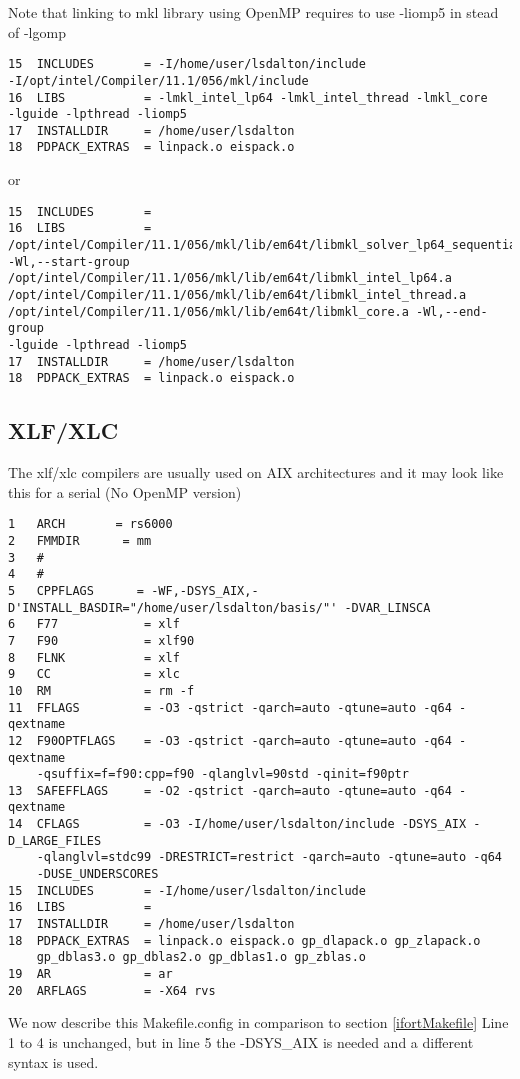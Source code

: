 Note that linking to mkl library using OpenMP requires to use -liomp5 in stead of -lgomp
\begin{verbatim}
15  INCLUDES       = -I/home/user/lsdalton/include 
-I/opt/intel/Compiler/11.1/056/mkl/include
16  LIBS           = -lmkl_intel_lp64 -lmkl_intel_thread -lmkl_core 
-lguide -lpthread -liomp5
17  INSTALLDIR     = /home/user/lsdalton
18  PDPACK_EXTRAS  = linpack.o eispack.o
\end{verbatim}
or
\begin{verbatim}
15  INCLUDES       = 
16  LIBS           = 
/opt/intel/Compiler/11.1/056/mkl/lib/em64t/libmkl_solver_lp64_sequential.a 
-Wl,--start-group /opt/intel/Compiler/11.1/056/mkl/lib/em64t/libmkl_intel_lp64.a 
/opt/intel/Compiler/11.1/056/mkl/lib/em64t/libmkl_intel_thread.a 
/opt/intel/Compiler/11.1/056/mkl/lib/em64t/libmkl_core.a -Wl,--end-group 
-lguide -lpthread -liomp5 
17  INSTALLDIR     = /home/user/lsdalton
18  PDPACK_EXTRAS  = linpack.o eispack.o
\end{verbatim}

%
%
\subsection{XLF/XLC}
The xlf/xlc compilers are usually used on AIX architectures and it may look like this for a serial (No OpenMP version)
\begin{verbatim}
1   ARCH       = rs6000
2   FMMDIR      = mm
3   #
4   #
5   CPPFLAGS      = -WF,-DSYS_AIX,-D'INSTALL_BASDIR="/home/user/lsdalton/basis/"' -DVAR_LINSCA
6   F77            = xlf
7   F90            = xlf90
8   FLNK           = xlf
9   CC             = xlc
10  RM             = rm -f
11  FFLAGS         = -O3 -qstrict -qarch=auto -qtune=auto -q64 -qextname
12  F90OPTFLAGS    = -O3 -qstrict -qarch=auto -qtune=auto -q64 -qextname 
    -qsuffix=f=f90:cpp=f90 -qlanglvl=90std -qinit=f90ptr 
13  SAFEFFLAGS     = -O2 -qstrict -qarch=auto -qtune=auto -q64 -qextname
14  CFLAGS         = -O3 -I/home/user/lsdalton/include -DSYS_AIX -D_LARGE_FILES
    -qlanglvl=stdc99 -DRESTRICT=restrict -qarch=auto -qtune=auto -q64 
    -DUSE_UNDERSCORES 
15  INCLUDES       = -I/home/user/lsdalton/include 
16  LIBS           = 
17  INSTALLDIR     = /home/user/lsdalton
18  PDPACK_EXTRAS  = linpack.o eispack.o gp_dlapack.o gp_zlapack.o 
    gp_dblas3.o gp_dblas2.o gp_dblas1.o gp_zblas.o
19  AR             = ar
20  ARFLAGS        = -X64 rvs
\end{verbatim}
We now describe this Makefile.config in comparison to section \ref{ifortMakefile}
Line 1 to 4 is unchanged, but in line 5 the -DSYS\_AIX is needed and a different syntax is used. 


